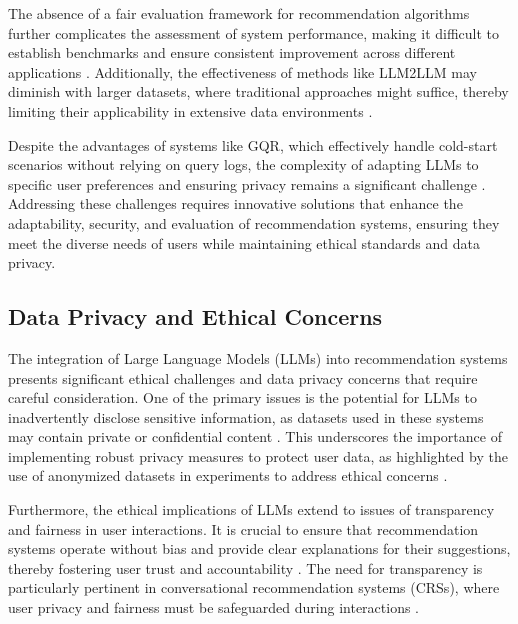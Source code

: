 The absence of a fair evaluation framework for recommendation algorithms further complicates the assessment of system performance, making it difficult to establish benchmarks and ensure consistent improvement across different applications \cite{xu2024llmbasedrecommendersbestsimple}. Additionally, the effectiveness of methods like LLM2LLM may diminish with larger datasets, where traditional approaches might suffice, thereby limiting their applicability in extensive data environments \cite{lee2024llm2llmboostingllmsnovel}.

Despite the advantages of systems like GQR, which effectively handle cold-start scenarios without relying on query logs, the complexity of adapting LLMs to specific user preferences and ensuring privacy remains a significant challenge \cite{bacciu2024generatingqueryrecommendationsllms}. Addressing these challenges requires innovative solutions that enhance the adaptability, security, and evaluation of recommendation systems, ensuring they meet the diverse needs of users while maintaining ethical standards and data privacy.

\subsection{Data Privacy and Ethical Concerns} \label{subsec:Data Privacy and Ethical Concerns}



The integration of Large Language Models (LLMs) into recommendation systems presents significant ethical challenges and data privacy concerns that require careful consideration. One of the primary issues is the potential for LLMs to inadvertently disclose sensitive information, as datasets used in these systems may contain private or confidential content \cite{zeng2024diversifiedpreferenceslargelanguage}. This underscores the importance of implementing robust privacy measures to protect user data, as highlighted by the use of anonymized datasets in experiments to address ethical concerns \cite{wang2023recmind}.



Furthermore, the ethical implications of LLMs extend to issues of transparency and fairness in user interactions. It is crucial to ensure that recommendation systems operate without bias and provide clear explanations for their suggestions, thereby fostering user trust and accountability . The need for transparency is particularly pertinent in conversational recommendation systems (CRSs), where user privacy and fairness must be safeguarded during interactions \cite{feng2023large}.



